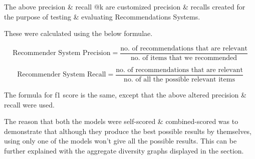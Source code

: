 The above precision \& recall @k are customized precision \& recalls created for the purpose of testing \& evaluating Recommendations Systems.

These were calculated using the below formulae.

\[\text{Recommender System Precision} = \frac{\text{no. of recommendations that are relevant}}{\text{no. of items that we recommended}}\]

\[\text{Recommender System Recall} = \frac{\text{no. of recommendations that are relevant}}{\text{no. of all the possible relevant items}}\]

\noindent The formula for f1 score is the same, except that the above altered precision \& recall were used.


The reason that both the models were self-scored \& combined-scored was to demonstrate that although they produce the best possible results by themselves, using only one of the models won't give all the possible results. This can be further explained with the aggregate diversity graphs displayed in the \textbf{} section.

